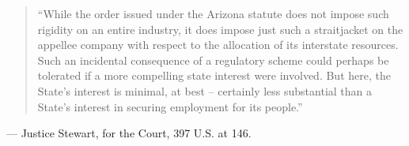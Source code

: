 \documentclass[12pt]{article}
\begin{document}
\begin{quote}
``While the order issued under the Arizona statute does not impose such rigidity on an entire industry, it does impose just such a straitjacket on the appellee company with respect to the allocation of its interstate resources. Such an incidental consequence of a regulatory scheme could perhaps be tolerated if a more compelling state interest were involved. But here, the State's interest is minimal, at best -- certainly less substantial than a State's interest in securing employment for its people.''
\end{quote}
\noindent --- Justice Stewart, for the Court, 397 U.S. at 146.
\end{document}
